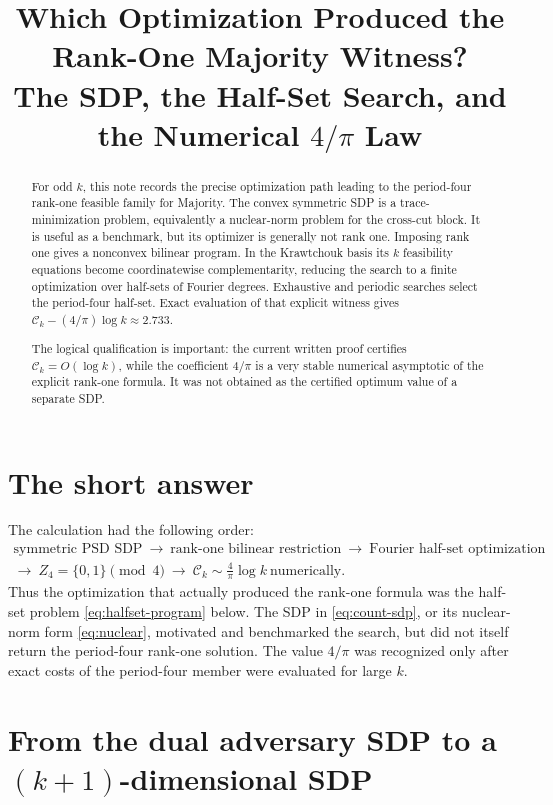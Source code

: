 \documentclass[11pt]{article}
\title{Which Optimization Produced the Rank-One Majority Witness?\\
The SDP, the Half-Set Search, and the Numerical $4/\pi$ Law}
\author{}
\date{}
\newcommand{\1}{\mathbf 1}
\begin{document}
\maketitle

\begin{abstract}
For odd $k$, this note records the precise optimization path leading to the
period-four rank-one feasible family for Majority.  The convex symmetric SDP
is a trace-minimization problem, equivalently a nuclear-norm problem for the
cross-cut block.  It is useful as a benchmark, but its optimizer is generally
not rank one.  Imposing rank one gives a nonconvex bilinear program.  In the
Krawtchouk basis its $k$ feasibility equations become coordinatewise
complementarity, reducing the search to a finite optimization over half-sets
of Fourier degrees.  Exhaustive and periodic searches select the period-four
half-set.  Exact evaluation of that explicit witness gives
$\mathcal C_k-(4/\pi)\log k\approx2.733$.

The logical qualification is important: the current written proof certifies
$\mathcal C_k=O(\log k)$, while the coefficient $4/\pi$ is a very stable
numerical asymptotic of the explicit rank-one formula.  It was not obtained
as the certified optimum value of a separate SDP.
\end{abstract}

\section{The short answer}

The calculation had the following order:
\[
\begin{gathered}
\boxed{\text{symmetric PSD SDP}}
\ \longrightarrow\
\boxed{\text{rank-one bilinear restriction}}
\ \longrightarrow\
\boxed{\text{Fourier half-set optimization}}\\[2mm]
\longrightarrow\
\boxed{Z_4=\{0,1\}\pmod 4}
\ \longrightarrow\
\boxed{\mathcal C_k\sim\tfrac4\pi\log k\ \text{numerically}}.
\end{gathered}
\]
Thus the optimization that actually produced the rank-one formula was the
half-set problem \eqref{eq:halfset-program} below.  The SDP in
\eqref{eq:count-sdp}, or its nuclear-norm form \eqref{eq:nuclear}, motivated
and benchmarked the search, but did not itself return the period-four
rank-one solution.  The value $4/\pi$ was recognized only after exact costs
of the period-four member were evaluated for large $k$.

\section{From the dual adversary SDP to a $(k+1)$-dimensional SDP}
\end{document}
